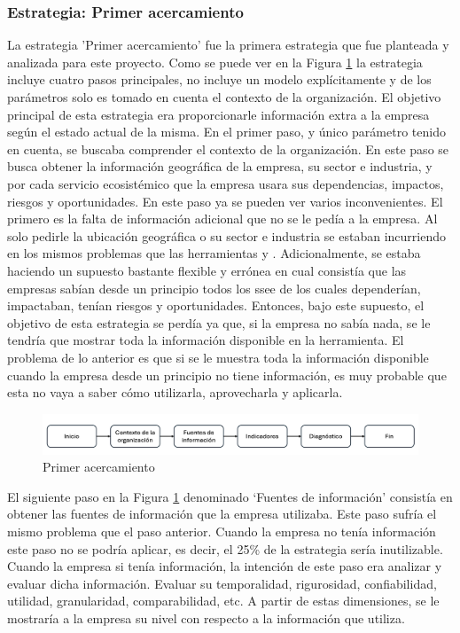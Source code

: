 \subsubsection{Estrategia: Primer acercamiento}
La estrategia 'Primer acercamiento' fue la primera estrategia que fue planteada y analizada para este proyecto. Como se puede ver en la Figura \ref{fig:primer-acercamiento} la estrategia incluye cuatro pasos principales, no incluye un modelo explícitamente y de los parámetros solo es tomado en cuenta el contexto de la organización. El objetivo principal de esta estrategia era proporcionarle información extra a la empresa según el estado actual de la misma. En el primer paso, y único parámetro tenido en cuenta, se buscaba comprender el contexto de la organización. En este paso se busca obtener la información geográfica de la empresa, su sector e industria, y por cada servicio ecosistémico que la empresa usara sus dependencias, impactos, riesgos y oportunidades. En este paso ya se pueden ver varios inconvenientes. El primero es la falta de información adicional que no se le pedía a la empresa. Al solo pedirle la ubicación geográfica o su sector e industria se estaban incurriendo en los mismos problemas que las herramientas  y . Adicionalmente, se estaba haciendo un supuesto bastante flexible y errónea en cual consistía que las empresas sabían desde un principio todos los \acrshort{ssee} de los cuales dependerían, impactaban, tenían riesgos y oportunidades. Entonces, bajo este supuesto, el objetivo de esta estrategia se perdía ya que, si la empresa no sabía nada, se le tendría que mostrar toda la información disponible en la herramienta. El problema de lo anterior es que si se le muestra toda la información disponible cuando la empresa desde un principio no tiene información, es muy probable que esta no vaya a saber cómo utilizarla, aprovecharla y aplicarla.

\begin{figure}[h!]
    \centering
    \includegraphics[scale=0.35]{images/4-desarrollo/estrategia-primer-acercamiento.png}
    \caption{Primer acercamiento}
    \label{fig:primer-acercamiento}
\end{figure}

El siguiente paso en la Figura \ref{fig:primer-acercamiento} denominado ‘Fuentes de información’ consistía en obtener las fuentes de información que la empresa utilizaba. Este paso sufría el mismo problema que el paso anterior. Cuando la empresa no tenía información este paso no se podría aplicar, es decir, el 25\% de la estrategia sería inutilizable. Cuando la empresa si tenía información, la intención de este paso era analizar y evaluar dicha información. Evaluar su temporalidad, rigurosidad, confiabilidad, utilidad, granularidad, comparabilidad, etc. A partir de estas dimensiones, se le mostraría a la empresa su nivel con respecto a la información que utiliza. 

